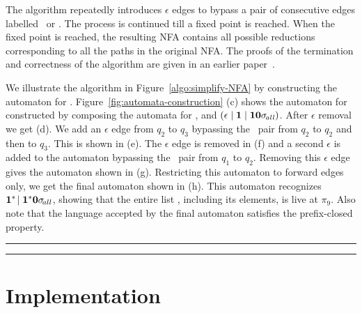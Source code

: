 \documentclass[9pt]{sigplanconf}
\newcommand{\comment}[1]{{\color{Myblue}{(#1)}}}
\begin{document}
\begin{enumerate}
\begin{figure*}[t]
\begin{boxedminipage}{\textwidth}
\begin{center}

\end{center}
\end{boxedminipage}
 \caption{Algorithm for transforming an NFA to  accept forward
   paths only.}\label{algo:simplify-NFA} \figrule
\end{figure*}

The algorithm repeatedly introduces  $\epsilon$ edges to bypass a
pair of consecutive edges labelled \bcar\acar\ or \bcdr\acdr.  The
process is  continued till  a fixed point  is reached.   When the
fixed point  is reached, the resulting NFA  contains all possible
reductions corresponding  to all the  paths in the  original NFA.
The proofs  of the termination  and correctness of  the algorithm
are given in an earlier paper~\cite{karkare07liveness}.

\comment{change according to example}
We  illustrate  the  algorithm  in  Figure~\ref{algo:simplify-NFA}  by
constructing      the       automaton      for      .
Figure~\ref{fig:automata-construction}  (c)  shows  the automaton  for
   constructed   by   composing  the   automata   for
,  and $(\epsilon \mid \mathbf{1}
\mid \mathbf{1}\mathbf{0}\sigma_{\mathit{\!all}})$.  After $\epsilon$ removal we
get (d). We  add an $\epsilon$ edge from $q_2$  to $q_3$ bypassing the
\bcdr\acdr\ pair from $q_2$ to $q_2$  and then to $q_3$. This is shown
in (e).  The $\epsilon$ edge is removed in (f) and a second $\epsilon$
is added to the automaton bypassing the \bcar\acar\ pair from $q_1$ to
$q_2$.   Removing this $\epsilon$  edge gives  the automaton  shown in
(g).  Restricting  this automaton  to forward edges  only, we  get the
final   automaton   shown    in   (h).   This   automaton   recognizes
$\mathbf{1}^{*}\!\mid\mathbf{1}^{*}\mathbf{0}  \sigma_{\mathit \!all}$,  showing that
the entire list \py, including  its elements, is live at $\pi_9$. Also
note that the  language accepted by the final  automaton satisfies the
prefix-closed property.


\hrule
\hrule



\section{Implementation}

\end{enumerate}
\end{document}
